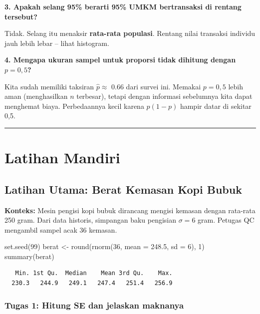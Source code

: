 \documentclass[
  indonesian,
  letterpaper,
]{book}
\newenvironment{Shaded}{\begin{snugshade}}{\end{snugshade}}
\newcommand{\AttributeTok}[1]{\textcolor[rgb]{0.40,0.45,0.13}{#1}}
\newcommand{\DecValTok}[1]{\textcolor[rgb]{0.68,0.00,0.00}{#1}}
\newcommand{\FloatTok}[1]{\textcolor[rgb]{0.68,0.00,0.00}{#1}}
\newcommand{\FunctionTok}[1]{\textcolor[rgb]{0.28,0.35,0.67}{#1}}
\newcommand{\NormalTok}[1]{\textcolor[rgb]{0.00,0.23,0.31}{#1}}
\newcommand{\OtherTok}[1]{\textcolor[rgb]{0.00,0.23,0.31}{#1}}
\begin{document}
\textbf{3. Apakah selang 95\% berarti 95\% UMKM bertransaksi di rentang
tersebut?}

Tidak. Selang itu menaksir \textbf{rata-rata populasi}. Rentang nilai
transaksi individu jauh lebih lebar -- lihat histogram.

\textbf{4. Mengapa ukuran sampel untuk proporsi tidak dihitung dengan
\(p = 0{,}5\)?}

Kita sudah memiliki taksiran \(\hat{p} \approx\) 0.66 dari survei ini.
Memakai \(p = 0{,}5\) lebih aman (menghasilkan \(n\) terbesar), tetapi
dengan informasi sebelumnya kita dapat menghemat biaya. Perbedaannya
kecil karena \(p(1-p)\) hampir datar di sekitar 0,5.

\begin{center}\rule{0.5\linewidth}{0.5pt}\end{center}

\section{Latihan Mandiri}\label{latihan-mandiri}

\subsection{Latihan Utama: Berat Kemasan Kopi
Bubuk}\label{latihan-utama-berat-kemasan-kopi-bubuk}

\textbf{Konteks:} Mesin pengisi kopi bubuk dirancang mengisi kemasan
dengan rata-rata 250 gram. Dari data historis, simpangan baku pengisian
\(\sigma = 6\) gram. Petugas QC mengambil sampel acak 36 kemasan.

\begin{Shaded}
\begin{Highlighting}[]
\FunctionTok{set.seed}\NormalTok{(}\DecValTok{99}\NormalTok{)}
\NormalTok{berat }\OtherTok{\textless{}{-}} \FunctionTok{round}\NormalTok{(}\FunctionTok{rnorm}\NormalTok{(}\DecValTok{36}\NormalTok{, }\AttributeTok{mean =} \FloatTok{248.5}\NormalTok{, }\AttributeTok{sd =} \DecValTok{6}\NormalTok{), }\DecValTok{1}\NormalTok{)}
\FunctionTok{summary}\NormalTok{(berat)}
\end{Highlighting}
\end{Shaded}

\begin{verbatim}
   Min. 1st Qu.  Median    Mean 3rd Qu.    Max. 
  230.3   244.9   249.1   247.4   251.4   256.9 
\end{verbatim}

\subsubsection{Tugas 1: Hitung SE dan jelaskan
maknanya}\label{tugas-1-hitung-se-dan-jelaskan-maknanya}
\end{document}
